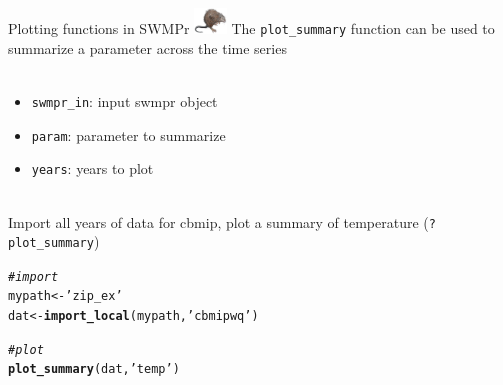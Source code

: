 \documentclass[xcolor=dvipsnames]{beamer}\usepackage[]{graphicx}\usepackage[]{color}
\makeatletter
\newcommand{\hlstr}[1]{\textcolor[rgb]{0.192,0.494,0.8}{#1}}%
\newcommand{\hlcom}[1]{\textcolor[rgb]{0.678,0.584,0.686}{\textit{#1}}}%
\newcommand{\hlstd}[1]{\textcolor[rgb]{0.345,0.345,0.345}{#1}}%
\newcommand{\hlkwb}[1]{\textcolor[rgb]{0.69,0.353,0.396}{#1}}%
\newcommand{\hlkwd}[1]{\textcolor[rgb]{0.737,0.353,0.396}{\textbf{#1}}}%
\newenvironment{kframe}{%
 \def\at@end@of@kframe{}%
 \ifinner\ifhmode%
  \def\at@end@of@kframe{\end{minipage}}%
  \begin{minipage}{\columnwidth}%
 \fi\fi%
 \def\FrameCommand##1{\hskip\@totalleftmargin \hskip-\fboxsep
 \colorbox{shadecolor}{##1}\hskip-\fboxsep
     \hskip-\linewidth \hskip-\@totalleftmargin \hskip\columnwidth}%
 \MakeFramed {\advance\hsize-\width
   \@totalleftmargin\z@ \linewidth\hsize
   \@setminipage}}%
 {\par\unskip\endMakeFramed%
 \at@end@of@kframe}
\newenvironment{knitrout}{}{} %
\makeatother
\begin{document}
\begin{frame}[fragile, t]{Plotting functions in SWMPr \includegraphics[width = 0.065\textwidth]{imgs/swmprat.png}}
The \texttt{plot_summary} function can be used to summarize a parameter across the time series\\~\\
\begin{itemize}
\item \texttt{swmpr\_in}: input swmpr object
\item \texttt{param}: parameter to summarize
\item \texttt{years}: years to plot\\~\\
\end{itemize}
Import all years of data for cbmip, plot a summary of temperature (\texttt{?plot\_summary})
\begin{knitrout}\scriptsize
{}\color{fgcolor}\begin{kframe}
\begin{alltt}
\hlcom{# import}
\hlstd{mypath} \hlkwb{<-} \hlstr{'zip_ex'}
\hlstd{dat} \hlkwb{<-} \hlkwd{import_local}\hlstd{(mypath,} \hlstr{'cbmipwq'}\hlstd{)}

\hlcom{# plot}
\hlkwd{plot_summary}\hlstd{(dat,} \hlstr{'temp'}\hlstd{)}
\end{alltt}
\end{kframe}
\end{knitrout}
\end{frame}
\end{document}
